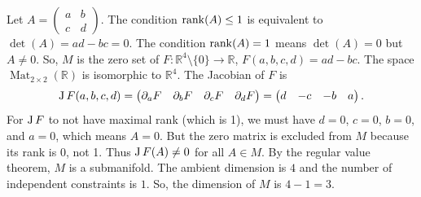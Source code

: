 \begin{exercisesolution}
Let $A = \begin{pmatrix} a & b \\ c & d \end{pmatrix}$. The condition $\operatorname{rank}(A) \leq 1$ is equivalent to $\det(A) = ad - bc = 0$.
The condition $\operatorname{rank}(A) = 1$ means $\det(A) = 0$ but $A \neq 0$.
So, $M$ is the zero set of $F : \mathbb{R}^4 \setminus \{0\} \to \mathbb{R}$, $F(a,b,c,d) = ad - bc$.
The space $\operatorname{Mat}_{2\times 2}(\mathbb{R})$ is isomorphic to $\mathbb{R}^4$.
The Jacobian of $F$ is
\[ \operatorname{J} F(a,b,c,d) = \begin{pmatrix} \partial_a F & \partial_b F & \partial_c F & \partial_d F \end{pmatrix} = \begin{pmatrix} d & -c & -b & a \end{pmatrix}. \]
For $\operatorname{J} F$ to not have maximal rank (which is 1), we must have $d = 0$, $c = 0$, $b = 0$, and $a = 0$, which means $A = 0$.
But the zero matrix is excluded from $M$ because its rank is 0, not 1.
Thus $\operatorname{J} F(A) \neq 0$ for all $A \in M$. By the regular value theorem, $M$ is a submanifold.
The ambient dimension is $4$ and the number of independent constraints is $1$.
So, the dimension of $M$ is $4 - 1 = 3$.
\end{exercisesolution}

